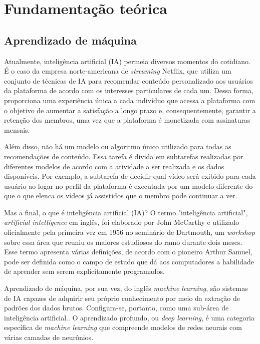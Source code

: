 
\chapter{Fundamentação teórica}

\section*{Aprendizado de máquina}

Atualmente, inteligência artificial (IA) permeia diversos momentos do cotidiano. É o caso da empresa norte-americana de \textit{streaming} Netflix, que utiliza um conjunto de técnicas de IA para recomendar conteúdo personalizado aos usuários da plataforma de acordo com os interesses particulares de cada um. Dessa forma, proporciona uma experiência única a cada indivíduo que acessa a plataforma com o objetivo de aumentar a satisfação a longo prazo e, consequentemente, garantir a retenção dos membros, uma vez que a plataforma é monetizada com assinaturas mensais. 

Além disso, não há um modelo ou algoritmo único utilizado para todas as recomendações de conteúdo. Essa tarefa é divida em subtarefas realizadas por diferentes modelos de acordo com a atividade a ser realizada e os dados disponíveis. Por exemplo, a subtarefa de  decidir qual vídeo será exibido para cada usuário ao logar no perfil da plataforma é executada por um modelo diferente do que o que elenca os vídeos já assistidos que o membro pode continuar a ver. \cite{netflix}

Mas a final, o que é inteligência artificial (IA)? O termo "inteligência artificial", \textit{artificial intelligence} em inglês, foi elaborado por John McCarthy e utilizado oficialmente pela primeira vez em 1956 no seminário de Dartmouth, um \textit{workshop} sobre essa área que reuniu os maiores estudiosos do ramo durante dois meses. \cite{aima} Esse termo apresenta várias definições, de acordo com o pioneiro Arthur Samuel, pode ser definida como o campo de estudo que dá aos computadores a habilidade de aprender sem serem explicitamente programados. \cite{dl-oreilly} 

Aprendizado de máquina, por sua vez, do inglês \textit{machine learning}, são sistemas de IA capazes de adquirir seu próprio conhecimento por meio da extração de padrões dos dados brutos. Configura-se, portanto, como uma sub-área de inteligência artificial.\cite{Goodfellow-et-al-2016}. O aprendizado profundo, ou \textit{deep learning}, é uma categoria específica de \textit{machine learning} que compreende modelos de redes neurais com várias camadas de neurônios.\cite{d2l}

